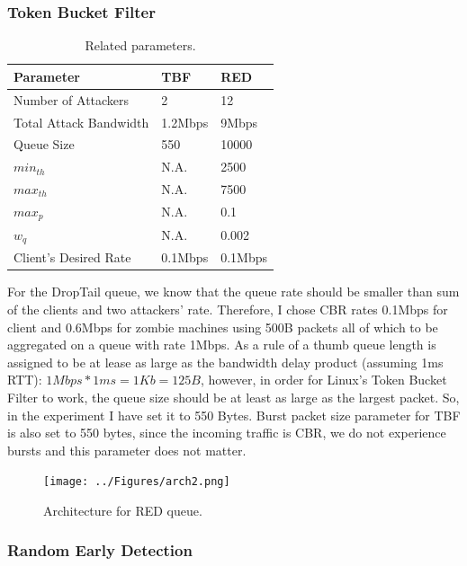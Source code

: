 \documentclass[12pt,twocolumn]{article}
\begin{document}
\subsubsection{Token Bucket Filter}

\begin{table}
    \centering
    \begin{tabularx}{0.5\textwidth}{X|X|X}
        Parameter & TBF & RED \\
        \hline
        \hline
        Number of Attackers & 2 & 12 \\
        Total Attack Bandwidth & 1.2Mbps & 9Mbps \\
        Queue Size & 550 & 10000 \\
        $min_{th}$ & N.A. & 2500 \\
        $max_{th}$ & N.A. & 7500 \\
        $max_p$ & N.A. & 0.1 \\
        $w_q$ & N.A. & 0.002 \\
        Client's Desired Rate & 0.1Mbps & 0.1Mbps \\
    \end{tabularx}
    \caption{Related parameters.}\label{tt}
\end{table}

For the DropTail queue, we know that the queue rate should be smaller than sum of the clients and two attackers’ rate.
Therefore, I chose CBR rates 0.1Mbps for client and 0.6Mbps for zombie machines using 500B packets all of which to be aggregated on a queue with rate 1Mbps.
As a rule of a thumb queue length is assigned to be at lease as large as the bandwidth delay product (assuming 1ms RTT): $1Mbps*1ms=1Kb=125B$, however, in order for Linux's Token Bucket Filter to work, the queue size should be at least as large as the largest packet. So, in the experiment I have set it to 550 Bytes.
Burst packet size parameter for TBF is also set to 550 bytes, since the incoming traffic is CBR, we do not experience bursts and this parameter does not matter.

\begin{figure}[b]
    \centering
    \texttt{[image: ../Figures/arch2.png]} \caption{Architecture for RED queue.} \label{arch2}
\end{figure}

\subsubsection{Random Early Detection}
\end{document}
